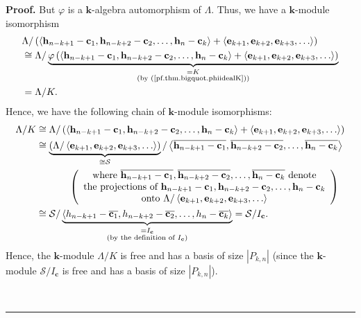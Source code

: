 \documentclass[numbers=enddot,12pt,final,onecolumn,notitlepage]{scrartcl}%
\theoremstyle{definition}
\newenvironment{proof}[1][Proof]{\noindent\textbf{#1.} }{\ \rule{0.5em}{0.5em}}
\begin{document}
\begin{proof}
But $\varphi$ is a $\mathbf{k}$-algebra automorphism of $\Lambda$. Thus, we
have a $\mathbf{k}$-module isomorphism%
\begin{align*}
&  \Lambda/\left(  \left\langle \mathbf{h}_{n-k+1}-\mathbf{c}_{1}%
,\mathbf{h}_{n-k+2}-\mathbf{c}_{2},\ldots,\mathbf{h}_{n}-\mathbf{c}%
_{k}\right\rangle +\left\langle \mathbf{e}_{k+1},\mathbf{e}_{k+2}%
,\mathbf{e}_{k+3},\ldots\right\rangle \right) \\
&  \cong\Lambda/\underbrace{\varphi\left(  \left\langle \mathbf{h}%
_{n-k+1}-\mathbf{c}_{1},\mathbf{h}_{n-k+2}-\mathbf{c}_{2},\ldots
,\mathbf{h}_{n}-\mathbf{c}_{k}\right\rangle +\left\langle \mathbf{e}%
_{k+1},\mathbf{e}_{k+2},\mathbf{e}_{k+3},\ldots\right\rangle \right)
}_{\substack{=K\\\text{(by (\ref{pf.thm.bigquot.phiidealK}))}}}\\
&  =\Lambda/K.
\end{align*}
Hence, we have the following chain of $\mathbf{k}$-module isomorphisms:%
\begin{align*}
\Lambda/K  &  \cong\Lambda/\left(  \left\langle \mathbf{h}_{n-k+1}%
-\mathbf{c}_{1},\mathbf{h}_{n-k+2}-\mathbf{c}_{2},\ldots,\mathbf{h}%
_{n}-\mathbf{c}_{k}\right\rangle +\left\langle \mathbf{e}_{k+1},\mathbf{e}%
_{k+2},\mathbf{e}_{k+3},\ldots\right\rangle \right) \\
&  \cong\underbrace{\left(  \Lambda/\left\langle \mathbf{e}_{k+1}%
,\mathbf{e}_{k+2},\mathbf{e}_{k+3},\ldots\right\rangle \right)  }%
_{\cong\mathcal{S}}/\left\langle \overline{\mathbf{h}_{n-k+1}-\mathbf{c}_{1}%
},\overline{\mathbf{h}_{n-k+2}-\mathbf{c}_{2}},\ldots,\overline{\mathbf{h}%
_{n}-\mathbf{c}_{k}}\right\rangle \\
&  \ \ \ \ \ \ \ \ \ \ \left(
\begin{array}
[c]{c}%
\text{where }\overline{\mathbf{h}_{n-k+1}-\mathbf{c}_{1}},\overline
{\mathbf{h}_{n-k+2}-\mathbf{c}_{2}},\ldots,\overline{\mathbf{h}_{n}%
-\mathbf{c}_{k}}\text{ denote}\\
\text{the projections of }\mathbf{h}_{n-k+1}-\mathbf{c}_{1},\mathbf{h}%
_{n-k+2}-\mathbf{c}_{2},\ldots,\mathbf{h}_{n}-\mathbf{c}_{k}\\
\text{onto }\Lambda/\left\langle \mathbf{e}_{k+1},\mathbf{e}_{k+2}%
,\mathbf{e}_{k+3},\ldots\right\rangle
\end{array}
\right) \\
&  \cong\mathcal{S}/\underbrace{\left\langle h_{n-k+1}-\overline
{\mathbf{c}_{1}},h_{n-k+2}-\overline{\mathbf{c}_{2}},\ldots,h_{n}%
-\overline{\mathbf{c}_{k}}\right\rangle }_{\substack{=I_{\mathbf{c}%
}\\\text{(by the definition of }I_{\mathbf{c}}\text{)}}}=\mathcal{S}%
/I_{\mathbf{c}}.
\end{align*}
Hence, the $\mathbf{k}$-module $\Lambda/K$ is free and has a basis of size
$\left\vert P_{k,n}\right\vert $ (since the $\mathbf{k}$-module $\mathcal{S}%
/I_{\mathbf{c}}$ is free and has a basis of size $\left\vert P_{k,n}%
\right\vert $).


\end{proof}
\end{document}
